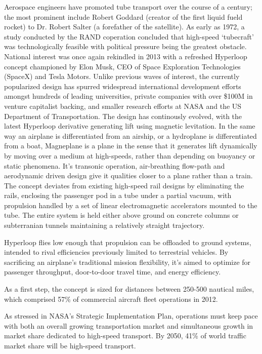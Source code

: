 	Aerospace engineers have promoted tube transport over the course of a century;
	the most prominent include Robert Goddard \cite{Goddard} (creator of the first liquid fueld
	rocket) to Dr. Robert Salter (a forefather of the satellite). As early as 1972,
	a study conducted by the RAND coperation concluded that high-speed `tubecraft'
	was technologically feasible with political pressure being the greatest
	obstacle.\cite{RAND} National interest was once again rekindled in 2013 with a refreshed
	Hyperloop concept championed by Elon Musk, CEO of Space Exploration
	Technologies (SpaceX) and Tesla Motors.\cite{Musk}
	Unlike previous waves of interest, the currently
	popularized design has spurred widespread international development efforts
	amongst hundreds of leading universities, private companies with over \$100M
	in venture capitalist backing, and smaller research efforts at NASA and the
	US Department of Transportation. \cite{Chin}
	The design has continously evolved, with the latest Hyperloop derivative
	generating lift using magnetic levitation.
	In the same way an airplane is differentiated from an airship,
	or a hydroplane is differentiated from a boat,
	Magneplane is a plane in the sense that it generates lift dynamically
	by moving over a medium at high-speeds,
	rather than depending on buoyancy or static phenomena.
	It's transonic operation, air-breathing flow-path and aerodynamic
	driven design give it qualities closer to a plane rather than a train.
	The concept deviates from existing high-speed rail designs by eliminating
	the rails, enclosing the passenger pod in a tube under a partial vacuum,
	with propulsion handled by a set of linear electromagnetic accelerators
	mounted to the tube. The entire system is held either above ground on concrete
	columns or subterranian tunnels maintaining a relatively straight trajectory.

	Hyperloop flies low enough that propulsion can be offloaded to
	ground systems, intended to rival efficiencies previously limited to terrestrial
	vehicles. By sacrificing an airplane’s traditional mission flexibility,
	it’s aimed to optimize for passenger throughput, door-to-door travel time, and energy
	efficiency.

	As a first step, the concept is sized for distances between 250-500 nautical miles,
	which comprised 57\% of commercial aircraft fleet operations in 2012.

	As stressed in NASA's Strategic Implementation Plan, operations must keep pace
	with both an overall growing transportation market and simultaneous growth in
	market share dedicated to high-speed transport. By 2050, 41\% of world traffic
	market share will be high-speed transport. \cite{Schafer}

